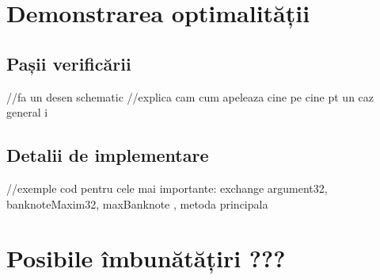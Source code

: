 \section{Demonstrarea optimalității}
    \subsection{Pașii verificării}
    //fa un desen schematic
    //explica cam cum apeleaza cine pe cine pt un caz general i 

    \subsection{Detalii de implementare}
    //exemple cod pentru cele mai importante: exchange argument32, banknoteMaxim32, maxBanknote , metoda principala

\section{Posibile îmbunătățiri ???}


